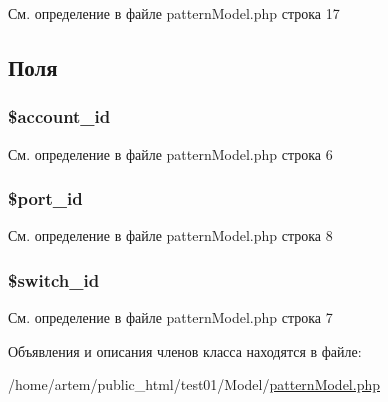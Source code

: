 См. определение в файле pattern\-Model.\-php строка 17



\subsection{Поля}
\hypertarget{classpattern_model_a7c3eb7a98818df12bc88e63ac7ea9c63}{
\subsubsection[{\$account\-\_\-id}]{\setlength{\rightskip}{0pt plus 5cm}\$account\-\_\-id}}\label{classpattern_model_a7c3eb7a98818df12bc88e63ac7ea9c63}


См. определение в файле pattern\-Model.\-php строка 6

\hypertarget{classpattern_model_ad8662b1c3f632fb3bf4b108a062b7474}{
\subsubsection[{\$port\-\_\-id}]{\setlength{\rightskip}{0pt plus 5cm}\$port\-\_\-id}}\label{classpattern_model_ad8662b1c3f632fb3bf4b108a062b7474}


См. определение в файле pattern\-Model.\-php строка 8

\hypertarget{classpattern_model_a21ec74990029279615d417ec27831ccf}{
\subsubsection[{\$switch\-\_\-id}]{\setlength{\rightskip}{0pt plus 5cm}\$switch\-\_\-id}}\label{classpattern_model_a21ec74990029279615d417ec27831ccf}


См. определение в файле pattern\-Model.\-php строка 7



Объявления и описания членов класса находятся в файле\-:\begin{DoxyCompactItemize}
\item 
/home/artem/public\-\_\-html/test01/\-Model/\hyperlink{pattern_model_8php}{pattern\-Model.\-php}\end{DoxyCompactItemize}
